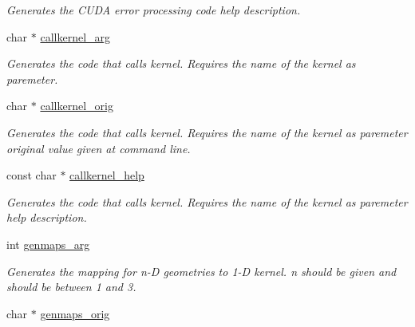 \begin{DoxyCompactItemize}
\begin{DoxyCompactList}\small\item\em Generates the C\-U\-D\-A error processing code help description. \end{DoxyCompactList}\item 
\hypertarget{structgengetopt__args__info_a92a20f77ed92a14c432f82d4bbfa50a3}{char $\ast$ \hyperlink{structgengetopt__args__info_a92a20f77ed92a14c432f82d4bbfa50a3}{callkernel\-\_\-arg}}\label{structgengetopt__args__info_a92a20f77ed92a14c432f82d4bbfa50a3}

\begin{DoxyCompactList}\small\item\em Generates the code that calls kernel. Requires the name of the kernel as paremeter. \end{DoxyCompactList}\item 
\hypertarget{structgengetopt__args__info_aac0e43d4b45f2a23eb75150b32c1718f}{char $\ast$ \hyperlink{structgengetopt__args__info_aac0e43d4b45f2a23eb75150b32c1718f}{callkernel\-\_\-orig}}\label{structgengetopt__args__info_aac0e43d4b45f2a23eb75150b32c1718f}

\begin{DoxyCompactList}\small\item\em Generates the code that calls kernel. Requires the name of the kernel as paremeter original value given at command line. \end{DoxyCompactList}\item 
\hypertarget{structgengetopt__args__info_a81fffda969e86895c3b0c1d88f5760a4}{const char $\ast$ \hyperlink{structgengetopt__args__info_a81fffda969e86895c3b0c1d88f5760a4}{callkernel\-\_\-help}}\label{structgengetopt__args__info_a81fffda969e86895c3b0c1d88f5760a4}

\begin{DoxyCompactList}\small\item\em Generates the code that calls kernel. Requires the name of the kernel as paremeter help description. \end{DoxyCompactList}\item 
\hypertarget{structgengetopt__args__info_a28ca84f3696ab638a60223932fbd6a13}{int \hyperlink{structgengetopt__args__info_a28ca84f3696ab638a60223932fbd6a13}{genmaps\-\_\-arg}}\label{structgengetopt__args__info_a28ca84f3696ab638a60223932fbd6a13}

\begin{DoxyCompactList}\small\item\em Generates the mapping for n-\/\-D geometries to 1-\/\-D kernel. n should be given and should be between 1 and 3. \end{DoxyCompactList}\item 
\hypertarget{structgengetopt__args__info_ad8b5612f3a58e8eb93ebc26f7f5548a1}{char $\ast$ \hyperlink{structgengetopt__args__info_ad8b5612f3a58e8eb93ebc26f7f5548a1}{genmaps\-\_\-orig}}\label{structgengetopt__args__info_ad8b5612f3a58e8eb93ebc26f7f5548a1}


\end{DoxyCompactItemize}
